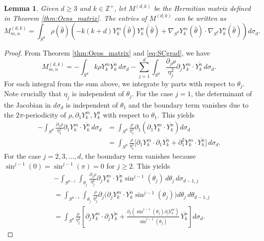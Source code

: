 \documentclass[11pt]{amsart}
\theoremstyle{definition}
\theoremstyle{plain}
\newtheorem{lemma}[definition]{Lemma}
\theoremstyle{remark}
\newcommand{\Z}{\mathbb{Z}}
\newcommand{\del}{\partial}
\newcommand{\cc}{\overline}
\begin{document}
\begin{lemma} \label{thm:Oeps_matrix1} 
Given $d\ge 3$ and $k\in\Z^+$, let $M^{(d, k)}$ be the Hermitian matrix defined in Theorem \ref{thm:Oeps_matrix}. The entries of $M^{(d, k)}$ can be written as 
\begin{equation} \label{eq:Oeps_matrix1} 
M_{m, n}^{(d, k)} = \int_{S^d} \rho(\hat\theta)\left(-k(k + d)Y_k^m(\hat\theta)\cc{Y_k^n(\hat\theta)} + \nabla_{S^d}Y_k^m(\hat\theta)\cdot\nabla_{S^d}\cc{Y_k^n(\hat\theta)}\right) d\sigma_d. 
\end{equation} 
\end{lemma} 
\begin{proof} 
From Theorem \ref{thm:Oeps_matrix} and \eqref{eq:SCgrad}, we have 
\begin{equation} \label{eq:Oeps_matrix1a} 
M_{m, n}^{(d, k)} = -\int_{S^d} k\rho Y_k^m\cc{Y_k^n}\, d\sigma_d - \sum_{j = 1}^d \int_{S^d} \frac{\del_j\rho}{\eta_j^2}\del_jY_k^m\cdot \cc{Y_k^n}\, d\sigma_d.
\end{equation} 
For each integral from the sum above, we integrate by parts with respect to $\theta_j$. Note crucially that $\eta_j$ is independent of $\theta_j$. For the case $j = 1$, the determinant of the Jacobian in $d\sigma_d$ is independent of $\theta_1$ and the boundary term vanishes due to the $2\pi$-periodicity of $\rho, \del_1Y_k^m, Y_k^n$ with respect to $\theta_1$. This yields 
\begin{align*} 
-\int_{S^d} \frac{\del_1\rho}{\eta_1^2}\del_1Y_k^m\cdot \cc{Y_k^n}\, d\sigma_d & = \int_{S^d} \frac{\rho}{\eta_1^2}\del_1\left(\del_1Y_k^m\cdot \cc{Y_k^n}\right)d\sigma_d \\ 
& = \int_{S^d} \frac{\rho}{\eta_1^2}\Big[\del_1Y_k^m\cdot \del_1\cc{Y_k^n} + \del_1^2Y_k^m\cdot \cc{Y_k^n}\Big]\, d\sigma_d. 
\end{align*} 
For the case $j = 2, 3, \dots, d$, the boundary term vanishes because $\sin^{j - 1}(0) = \sin^{j - 1}(\pi) = 0$ for $j\ge 2$. This yields 
\begin{align*} 
& -\int_{S^{d - 1}}\int_{\theta_j} \frac{\del_j\rho}{\eta_j^2}\del_jY_k^m\cdot \cc{Y_k^n}\sin^{j - 1}(\theta_j)\, d\theta_j\, d\sigma_{d - 1, j} \\ 
& = \int_{S^{d - 1}}\int_{\theta_j} \frac{\rho}{\eta_j^2}\del_j\Big(\del_jY_k^m\cdot \cc{Y_k^n}\sin^{j - 1}(\theta_j)\Big) d\theta_j\, d\theta_{d - 1, j} \\ 
& = \int_{S^d} \frac{\rho}{\eta_j^2} \left[\del_jY_k^m\cdot \del_j\cc{Y_k^n} + \frac{\del_j\left(\sin^{j - 1}(\theta_j)\del_jY_k^m\right)}{\sin^{j - 1}(\theta_j)}\, \cc{Y_k^n}\right] d\sigma_d.  

\end{align*}
\end{proof}
\end{document}
